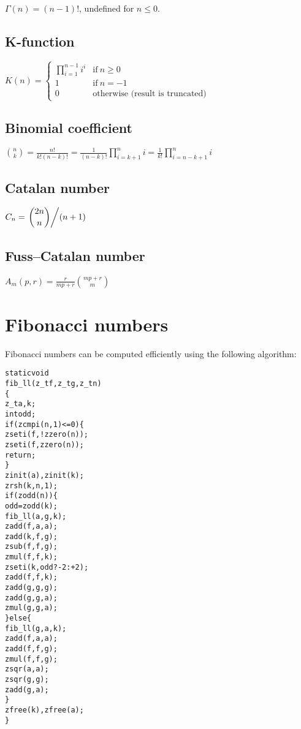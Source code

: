 $\Gamma(n) = (n - 1)!$, undefined for $n \le 0$.


\subsection{K-function}
\label{sec:K-function}

\( \displaystyle{
    K(n) = \left \lbrace \begin{array}{ll}
      \displaystyle{\prod_{i = 1}^{n - 1} i^i}  & \textrm{if}~ n \ge 0 \\
      1 & \textrm{if}~ n = -1 \\
      0 & \textrm{otherwise (result is truncated)}
    \end{array} \right .
}\)


\subsection{Binomial coefficient}
\label{sec:Binomial coefficient}

\( \displaystyle{
    \binom{n}{k} = \frac{n!}{k!(n - k)!}
    = \frac{1}{(n - k)!} \prod_{i = k + 1}^n i
    = \frac{1}{k!} \prod_{i = n - k + 1}^n i
}\)


\subsection{Catalan number}
\label{sec:Catalan number}

\( \displaystyle{
    C_n = \left . \binom{2n}{n} \middle / (n + 1) \right .
}\)


\subsection{Fuss–Catalan number}
\label{sec:Fuss-Catalan number} %

\( \displaystyle{
    A_m(p, r) = \frac{r}{mp + r} \binom{mp + r}{m}
}\)


\newpage
\section{Fibonacci numbers}
\label{sec:Fibonacci numbers}

Fibonacci numbers can be computed efficiently
using the following algorithm:

\begin{alltt}
   static void
   fib_ll(z_t f, z_t g, z_t n)
   \{
       z_t a, k;
       int odd;
       if (zcmpi(n, 1) <= 0) \{
           zseti(f, !zzero(n));
           zseti(f, zzero(n));
           return;
       \}
       zinit(a), zinit(k);
       zrsh(k, n, 1);
       if (zodd(n)) \{
           odd = zodd(k);
           fib_ll(a, g, k);
           zadd(f, a, a);
           zadd(k, f, g);
           zsub(f, f, g);
           zmul(f, f, k);
           zseti(k, odd ? -2 : +2);
           zadd(f, f, k);
           zadd(g, g, g);
           zadd(g, g, a);
           zmul(g, g, a);
       \} else \{
           fib_ll(g, a, k);
           zadd(f, a, a);
           zadd(f, f, g);
           zmul(f, f, g);
           zsqr(a, a);
           zsqr(g, g);
           zadd(g, a);
       \}
       zfree(k), zfree(a);
   \}
\end{alltt}

